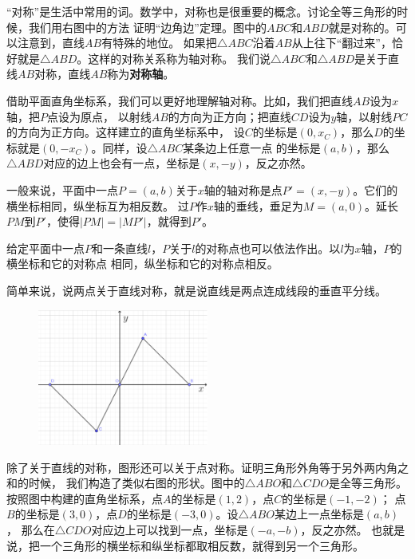 \documentclass[12pt,UTF8]{ctexbook}
\begin{document}
“对称”是生活中常用的词。数学中，对称也是很重要的概念。讨论全等三角形的时候，我们用右图中的方法
证明“边角边”定理。图中的$ABC$和$ABD$就是对称的。可以注意到，直线$AB$有特殊的地位。
如果把$\triangle ABC$沿着$AB$从上往下“翻过来”，恰好就是$\triangle ABD$。这样的对称关系称为轴对称。
我们说$\triangle ABC$和$\triangle ABD$是关于直线$AB$对称，直线$AB$称为\textbf{对称轴}。

借助平面直角坐标系，我们可以更好地理解轴对称。比如，我们把直线$AB$设为$x$轴，把$P$点设为原点，
以射线$AB$的方向为正方向；把直线$CD$设为$y$轴，以射线$PC$的方向为正方向。这样建立的直角坐标系中，
设$C$的坐标是$(0, x_C)$，那么$D$的坐标就是$(0, -x_C)$。同样，设$\triangle ABC$某条边上任意一点
的坐标是$(a, b)$，那么$\triangle ABD$对应的边上也会有一点，坐标是$(x, -y)$，反之亦然。

一般来说，平面中一点$P = (a, b)$关于$x$轴的轴对称是点$P' = (x, -y)$。它们的横坐标相同，纵坐标互为相反数。
过$P$作$x$轴的垂线，垂足为$M = (a,0)$。延长$PM$到$P'$，使得$|PM| = |MP'|$，就得到$P'$。

给定平面中一点$P$和一条直线$l$，$P$关于$l$的对称点也可以依法作出。以$l$为$x$轴，$P$的横坐标和它的对称点
相同，纵坐标和它的对称点相反。

简单来说，说两点关于直线对称，就是说直线是两点连成线段的垂直平分线。

\begin{figure} %
    \vspace{-15pt}
    \centering
    \includegraphics[width=0.5\textwidth]{轴对称1.png}
\end{figure}

除了关于直线的对称，图形还可以关于点对称。证明三角形外角等于另外两内角之和的时候，
我们构造了类似右图的形状。图中的$\triangle ABO$和$\triangle CDO$是全等三角形。
按照图中构建的直角坐标系，点$A$的坐标是$(1,2)$，点$C$的坐标是$(-1, -2)$；
点$B$的坐标是$(3,0)$，点$D$的坐标是$(-3, 0)$。设$\triangle ABO$某边上一点坐标是$(a, b)$，
那么在$\triangle CDO$对应边上可以找到一点，坐标是$(-a, -b)$，反之亦然。
也就是说，把一个三角形的横坐标和纵坐标都取相反数，就得到另一个三角形。
\end{document}
